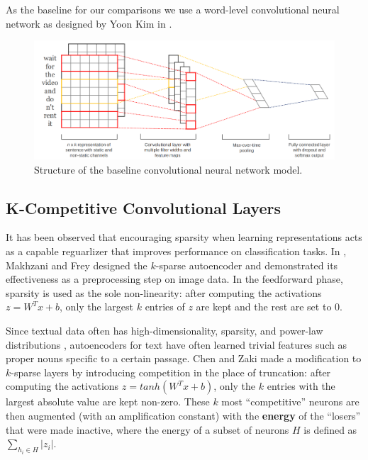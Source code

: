 \documentclass{vldb}
\begin{document}
As the baseline for our comparisons we use a word-level convolutional neural network as designed by Yoon Kim in \cite{Kim14f}.

\begin{figure}[h]
\includegraphics[width=\linewidth]{cnn.png}
\caption{\textmd{Structure of the baseline convolutional neural network model.}}
\end{figure}

\subsection{K-Competitive Convolutional Layers}
It has been observed that encouraging sparsity when learning representations acts as a capable reguarlizer that improves performance on classification tasks. In \cite{MakhzaniF13}, Makhzani and Frey designed the $k$-sparse autoencoder and demonstrated its effectiveness as a preprocessing step on image data. In the feedforward phase, sparsity is used as the sole non-linearity: after computing the activations $z = W^Tx + b$, only the largest $k$ entries of $z$ are kept and the rest are set to 0. 

Since textual data often has high-dimensionality, sparsity, and power-law distributions \cite{KATE}, autoencoders for text have often learned trivial features such as proper nouns specific to a certain passage. Chen and Zaki made a modification to $k$-sparse layers by introducing competition in the place of truncation: after computing the activations $z = tanh(W^Tx + b)$, only the $k$ entries with the largest absolute value are kept non-zero. These $k$ most ``competitive'' neurons are then augmented (with an amplification constant) with the \textbf{energy} of the ``losers'' that were made inactive, where the energy of a subset of neurons $H$ is defined as $\sum_{h_i \in H} |z_i|$. 
\end{document}
